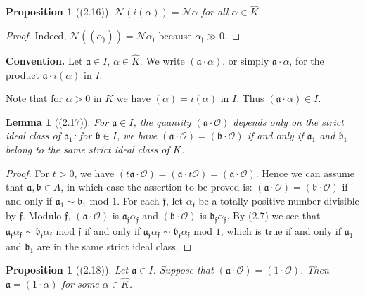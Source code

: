 \documentclass[12pt,a4paper]{article}
\theoremstyle{plain}
\newtheorem{lemma}[theorem]{Lemma}
\newtheorem{proposition}[theorem]{Proposition}
\theoremstyle{definition}
\newcommand{\ff}{\mathfrak{f}}
\begin{document}
\begin{proposition}[(2.16)]\label{prop:norm-idele}
$\mathcal{N}(i(\alpha))=\mathcal{N}\alpha$ for all $\alpha\in\hat{K}$.
\end{proposition}

\begin{proof}
Indeed, $\mathcal{N}((\alpha_{\ff}))=\mathcal{N}\alpha_{\ff}$ because $\alpha_{\ff}\gg0$.
\end{proof}

\textbf{Convention.} Let $\mathfrak{a}\in I$, $\alpha\in\hat{K}$. We write $(\mathfrak{a}\cdot\alpha)$, or simply $\mathfrak{a}\cdot\alpha$, for the product $\mathfrak{a}\cdot i(\alpha)$ in $I$.

Note that for $\alpha>0$ in $K$ we have $(\alpha)=i(\alpha)$ in $I$. Thus $(\mathfrak{a}\cdot\alpha)\in I$.

\begin{lemma}[(2.17)]\label{lem:class}
For $\mathfrak{a}\in I$, the quantity $(\mathfrak{a}\cdot\mathcal{O})$ depends only on the strict ideal class of $\mathfrak{a}_1$: for $\mathfrak{b}\in I$, we have $(\mathfrak{a}\cdot\mathcal{O})=(\mathfrak{b}\cdot\mathcal{O})$ if and only if $\mathfrak{a}_1$ and $\mathfrak{b}_1$ belong to the same strict ideal class of $K$.
\end{lemma}

\begin{proof}
For $t>0$, we have $(t\mathfrak{a}\cdot\mathcal{O})=(\mathfrak{a}\cdot t\mathcal{O})=(\mathfrak{a}\cdot\mathcal{O})$. Hence we can assume that $\mathfrak{a},\mathfrak{b}\in A$, in which case the assertion to be proved is: $(\mathfrak{a}\cdot\mathcal{O})=(\mathfrak{b}\cdot\mathcal{O})$ if and only if $\mathfrak{a}_1\sim\mathfrak{b}_1$ mod $1$. For each $\ff$, let $\alpha_{\ff}$ be a totally positive number divisible by $\ff$. Modulo $\ff$, $(\mathfrak{a}\cdot\mathcal{O})$ is $\mathfrak{a}_{\ff}\alpha_{\ff}$ and $(\mathfrak{b}\cdot\mathcal{O})$ is $\mathfrak{b}_{\ff}\alpha_{\ff}$. By (2.7) we see that $\mathfrak{a}_{\ff}\alpha_{\ff}\sim\mathfrak{b}_{\ff}\alpha_{\ff}$ mod $\ff$ if and only if $\mathfrak{a}_{\ff}\alpha_{\ff}\sim\mathfrak{b}_{\ff}\alpha_{\ff}$ mod $1$, which is true if and only if $\mathfrak{a}_1$ and $\mathfrak{b}_1$ are in the same strict ideal class.
\end{proof}

\begin{proposition}[(2.18)]\label{prop:unit-class}
Let $\mathfrak{a}\in I$. Suppose that $(\mathfrak{a}\cdot\mathcal{O})=(1\cdot\mathcal{O})$. Then $\mathfrak{a}=(1\cdot\alpha)$ for some $\alpha\in\hat{K}$.
\end{proposition}
\end{document}
